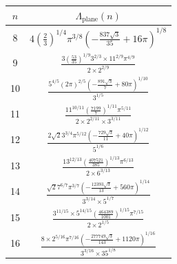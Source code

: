 \documentclass[10pt,reqno]{amsart}
\numberwithin{equation}{section}
\theoremstyle{definition}
\DeclareMathOperator{\plane}{plane}
\begin{document}
{{\begin{table}
\setlength{\arrayrulewidth}{0.3mm}
\setlength{\tabcolsep}{22pt}
\renewcommand{\arraystretch}{1.5}
\renewcommand{\arraystretch}{2.5}
\begin{center}
\begin{tabular}{||c c ||} 
 \hline
$n$ & $\Lambda_{\plane}(n)$  \\ [0.5ex] 
 \hline\hline
 8 & $4\left(\frac{2}{3}\right)^{1 / 4} \pi^{3 / 8}\left(-\frac{837 \sqrt{3}}{35}+16 \pi\right)^{1 / 8}$
 \\ 
 \hline
 9 & $\frac{3\left(\frac{53}{35}\right)^{1 / 9} 3^{2 / 3} \times 11^{2 / 9} \pi^{4 / 9}}{2 \times 2^{2 / 9}}$ 
 \\ 
 \hline
10 & $\frac{5^{4 / 5}(2 \pi)^{2 / 5}\left(-\frac{891 \sqrt{3}}{7}+80 \pi\right)^{1 / 10}}{3^{1 / 5}}$ 
\\ 
 \hline
 11 & $\frac{11^{10 / 11}\left(\frac{7199}{7}\right)^{1 / 11} \pi^{5 / 11}}{2 \times 2^{2 / 11} \times 3^{3 / 11}}$ 
 \\
  \hline
  12 & $\frac{2 \sqrt{2} 3^{3 / 4} \pi^{5 / 12}\left(-\frac{729 \sqrt{3}}{11}+40 \pi\right)^{1 / 12}}{5^{1 / 6}}$
  \\
    \hline
  13 & $\frac{13^{12 / 13}\left(\frac{407521}{385}\right)^{1 / 13} \pi^{6 / 13}}{2 \times 6^{3 / 13}}$ 
  \\
    \hline
  14 & $\frac{\sqrt{2} 7^{6 / 7} \pi^{3 / 7}\left(-\frac{12393 \sqrt{3}}{13}+560 \pi\right)^{1 / 14}}{3^{3 / 14} \times 5^{1 / 7}}$ 
  \\
    \hline
  15 & $\frac{3^{11 / 15} \times 5^{14 / 15}\left(\frac{464389}{1001}\right)^{1 / 15} \pi^{7 / 15}}{2 \times 2^{1 / 5}}$ 
  \\
    \hline
  16 &  $\frac{8 \times 2^{5 / 16} \pi^{7 / 16}\left(-\frac{277749 \sqrt{3}}{143}+1120 \pi\right)^{1 / 16}}{3^{3 / 16} \times 35^{1 / 8}}$
  \\
    \hline

\end{tabular}
\end{center}
\end{table}}}
\end{document}
